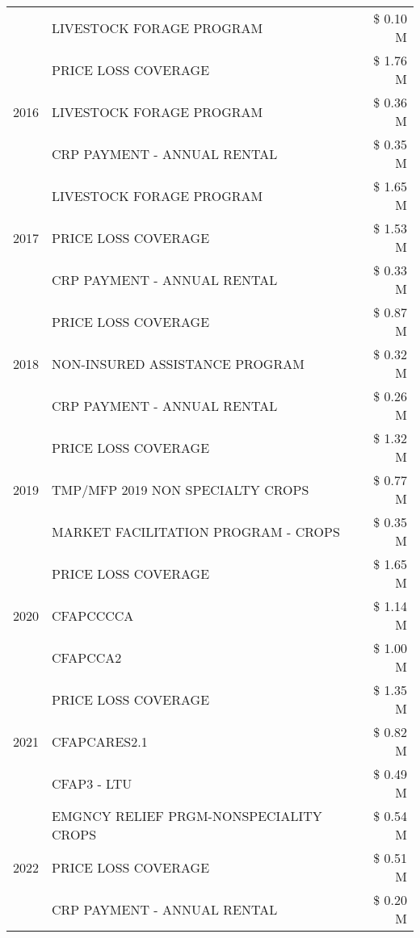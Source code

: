 \begin{tabular}{llr}
 & LIVESTOCK FORAGE PROGRAM & \$ 0.10 M \\
\cline{1-3}
\multirow[t]{3}{*}{2016} & PRICE LOSS COVERAGE & \$ 1.76 M \\
 & LIVESTOCK FORAGE PROGRAM & \$ 0.36 M \\
 & CRP PAYMENT - ANNUAL RENTAL & \$ 0.35 M \\
\cline{1-3}
\multirow[t]{3}{*}{2017} & LIVESTOCK FORAGE PROGRAM & \$ 1.65 M \\
 & PRICE LOSS COVERAGE & \$ 1.53 M \\
 & CRP PAYMENT - ANNUAL RENTAL & \$ 0.33 M \\
\cline{1-3}
\multirow[t]{3}{*}{2018} & PRICE LOSS COVERAGE & \$ 0.87 M \\
 & NON-INSURED ASSISTANCE PROGRAM & \$ 0.32 M \\
 & CRP PAYMENT - ANNUAL RENTAL & \$ 0.26 M \\
\cline{1-3}
\multirow[t]{3}{*}{2019} & PRICE LOSS COVERAGE & \$ 1.32 M \\
 & TMP/MFP 2019 NON SPECIALTY CROPS & \$ 0.77 M \\
 & MARKET FACILITATION PROGRAM - CROPS & \$ 0.35 M \\
\cline{1-3}
\multirow[t]{3}{*}{2020} & PRICE LOSS COVERAGE & \$ 1.65 M \\
 & CFAPCCCCA & \$ 1.14 M \\
 & CFAPCCA2 & \$ 1.00 M \\
\cline{1-3}
\multirow[t]{3}{*}{2021} & PRICE LOSS COVERAGE & \$ 1.35 M \\
 & CFAPCARES2.1 & \$ 0.82 M \\
 & CFAP3 - LTU & \$ 0.49 M \\
\cline{1-3}
\multirow[t]{3}{*}{2022} & EMGNCY RELIEF PRGM-NONSPECIALITY CROPS & \$ 0.54 M \\
 & PRICE LOSS COVERAGE & \$ 0.51 M \\
 & CRP PAYMENT - ANNUAL RENTAL & \$ 0.20 M \\
\cline{1-3}
\bottomrule
\end{tabular}

